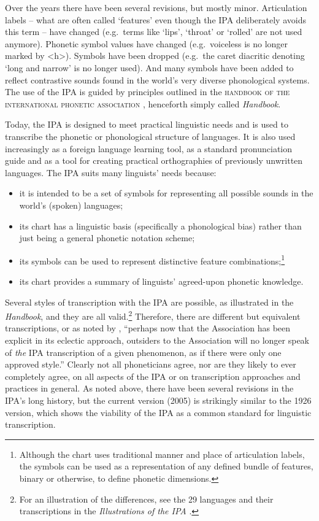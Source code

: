 Over the years there have been several revisions, but mostly minor. Articulation 
labels -- what are often called `features' even though the IPA
deliberately avoids this term -- have changed (e.g.\ terms like `lips', `throat'
or `rolled' are not used anymore). Phonetic symbol values have changed (e.g.\
voiceless is no longer marked by <h>). Symbols have been dropped (e.g.\ the
caret diacritic denoting `long and narrow' is no longer used). And many symbols
have been added to reflect contrastive sounds found in the world's very diverse
phonological systems. The use of the IPA is guided by principles outlined in 
the \textsc{handbook of the international phonetic association} \citep{IPA1999}, 
henceforth simply called \textit{Handbook}. 

Today, the IPA is designed to meet practical linguistic needs and is used to
transcribe the phonetic or phonological structure of languages. It is also used
increasingly as a foreign language learning tool, as a standard pronunciation
guide and as a tool for creating practical orthographies of previously unwritten
languages. The IPA suits many linguists' needs because:

\begin{itemize}

	\item it is intended to be a set of symbols for representing all possible
       sounds in the world's (spoken) languages;
	\item its chart has a linguistic basis (specifically a phonological bias)
       rather than just being a general phonetic notation scheme;
	\item its symbols can be used to represent distinctive feature
       combinations;\footnote{Although the chart uses traditional manner and
       place of articulation labels, the symbols can be used as a representation
       of any defined bundle of features, binary or otherwise, to define
       phonetic dimensions.}
	\item its chart provides a summary of linguists' agreed-upon phonetic 
	knowledge.

\end{itemize}

Several styles of transcription with the IPA are possible, as illustrated in the
\textit{Handbook}, and they are all valid.\footnote{For an illustration of
the differences, see the 29 languages and their transcriptions in the
\textit{Illustrations of the IPA} \citep[41--154]{IPA2007}.} Therefore, there are 
different but equivalent transcriptions, or as noted by \citet[64]{Ladefoged1990a}, 
``perhaps now that the Association has been explicit in its eclectic approach, outsiders to the
Association will no longer speak of \textit{the} IPA transcription of a given
phenomenon, as if there were only one approved style.'' Clearly not all
phoneticians agree, nor are they likely to ever completely agree, on all aspects of the
IPA or on transcription approaches and practices in general. As noted above, 
there have been several revisions in the IPA's long history, but the current version (2005) is
strikingly similar to the 1926 version, which shows the viability of the IPA as a
common standard for linguistic transcription.

